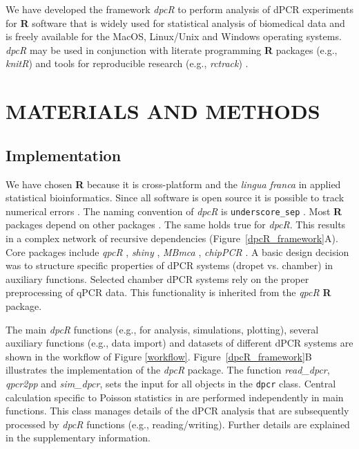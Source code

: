 \documentclass[a4,center,fleqn]{NAR}
\begin{document}
\enlargethispage{-65.1pt}
We have developed the framework \textit{dpcR} to perform analysis of dPCR 
experiments for \textbf{R} software that is widely used for statistical analysis 
of biomedical data and is freely available for the MacOS, Linux/Unix and Windows 
operating systems. \textit{dpcR}  may be used in conjunction with literate 
programming \textbf{R} packages (e.g., \textit{knitR}) and tools for 
reproducible research (e.g.,  \textit{rctrack}) \cite{liu_r_2014, rodiger_r_2015}. 

\section{MATERIALS AND METHODS}

\subsection{Implementation}

We have chosen \textbf{R} because it is cross-platform and the \textit{lingua 
franca} in applied statistical bioinformatics. Since all software is open source 
it is possible to track numerical errors \cite{rodiger_rkward_2012, 
rodiger_r_2015}. The naming convention of \textit{dpcR} is 
\texttt{underscore\_sep} \cite{Baaaath_2012}. Most \textbf{R} packages depend on 
other packages \cite{ooms_2013}. The same holds true for \textit{dpcR}. This 
results in a complex network of recursive dependencies 
(Figure~\ref{dpcR_framework}A). Core packages include \textit{qpcR} 
\cite{ritz_qpcr_2008}, \textit{shiny} \cite{shiny}, \textit{MBmca} 
\cite{rodiger_surface_2013}, \textit{chipPCR} \cite{roediger2015chippcr}. A 
basic design decision was to structure specific properties of dPCR systems 
(dropet vs. chamber) in auxiliary functions. Selected chamber dPCR systems rely 
on the proper preprocessing of qPCR data. This functionality is inherited from 
the \textit{qpcR} \textbf{R} package.

The main \textit{dpcR} functions (e.g., for analysis, simulations, plotting), 
several auxiliary functions (e.g., data import) and datasets of different 
dPCR systems are shown in the workflow of Figure \ref{workflow}. 
Figure~\ref{dpcR_framework}B illustrates the implementation of the \textit{dpcR} 
package. The function \textit{read\_dpcr}, \textit{qpcr2pp} and 
\textit{sim\_dpcr}, sets the input for all objects in the \texttt{dpcr} class. 
Central calculation specific to Poisson statistics in are performed 
independently in main functions. This class manages details of the dPCR analysis 
that are subsequently processed by \textit{dpcR} functions (e.g., 
reading/writing). Further details are explained in the supplementary 
information.
\end{document}
